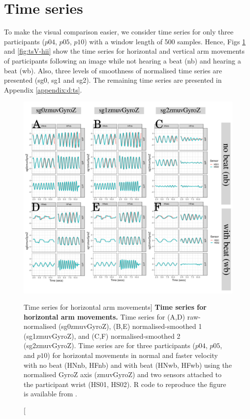 \section{Time series}
To make the visual comparison easier, we consider time series for only three 
participants ($p04$, $p05$, $p10$) with a window length of 500 samples.
Hence, Figs \ref{fig:tsH-hii} and \ref{fig:tsV-hii} show the 
time series for horizontal and vertical arm movements of participants 
following an image while not hearing a beat (nb) and hearing a beat (wb).
Also, three levels of smoothness of normalised time series are presented
 (sg0, sg1 and sg2).
The remaining time series are presented in Appendix \ref{appendix:d:ts}.
\begin{figure}
\centering
\includegraphics[width=1.0\textwidth]{fig_5_01}
    	\caption
	[Time series for horizontal arm movements]{
	{\bf Time series for horizontal arm movements.}
		Time series for (A,D) raw-normalised (sg0zmuvGyroZ), 
		(B,E) normalised-smoothed 1 (sg1zmuvGyroZ), and
		(C,F) normalised-smoothed 2 (sg2zmuvGyroZ).
		Time series are for three participants 
		($p04$, $p05$, and $p10$) 
		for horizontal movements in normal and faster velocity with
		no beat	(HNnb, HFnb) and with beat (HNwb, HFwb) using 
		the normalised GyroZ axis (zmuvGyroZ) and 
		two sensors attached to the participant wrist (HS01, HS02).
	R code to reproduce the figure is available from \cite{xochicale2018}.
        }
    \label{fig:tsH-hii}
\end{figure}
